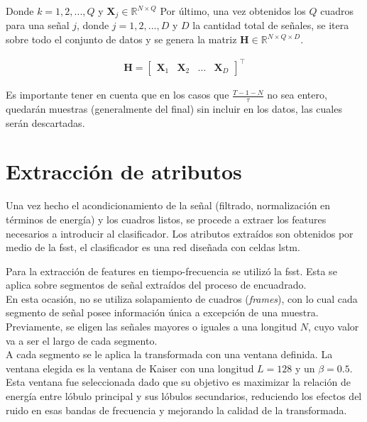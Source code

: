 \indent Donde $k = 1,2,...,Q$ y $\bm{X}_j \in \mathbb{R}^{N \times Q}$ Por último, una vez obtenidos los $Q$
cuadros para una señal $j$, donde $j = 1,2,...,D$ y $D$ la cantidad total de señales, se itera sobre todo el conjunto
de datos y se genera la matriz $\bm{H} \in \mathbb{R}^{N \times Q \times D}$.

\begin{align}
  \bm{H} = \left[\begin{array}{cccc}
    \bm{X}_1 &
    \bm{X}_2 &
    \dots &
    \bm{X}_D
  \end{array}\right]^\top
\end{align}

\indent Es importante tener en cuenta que en los casos que $\frac{T-1-N}{\tau}$ no sea entero, quedarán muestras
(generalmente del final) sin incluir en los datos, las cuales serán descartadas.

\section{Extracción de atributos}

\indent Una vez hecho el acondicionamiento de la señal (filtrado, normalización en términos de energía) y los
cuadros listos, se procede a extraer los features necesarios a introducir al clasificador. Los atributos extraídos
son obtenidos por medio de la \acrshort{fsst}, el clasificador es una red diseñada con celdas \acrshort{lstm}. \bigskip

\indent Para la extracción de features en tiempo-frecuencia se utilizó la \acrshort{fsst}. Esta se aplica sobre
segmentos de señal extraídos del proceso de encuadrado. \\
\indent En esta ocasión, no se utiliza solapamiento de cuadros (\textit{frames}), con lo cual cada segmento de señal
posee información única a excepción de una muestra. Previamente, se eligen las señales mayores o iguales a una
longitud $N$, cuyo valor va a ser el largo de cada segmento. \\
\indent A cada segmento se le aplica la transformada con una ventana definida. La ventana elegida es la ventana de
Kaiser con una longitud $L = 128$ y un $\beta = 0.5$. Esta ventana fue seleccionada dado que su objetivo es
maximizar la relación de energía entre lóbulo principal y sus lóbulos secundarios, reduciendo los efectos del ruido
en esas bandas de frecuencia y mejorando la calidad de la transformada.

